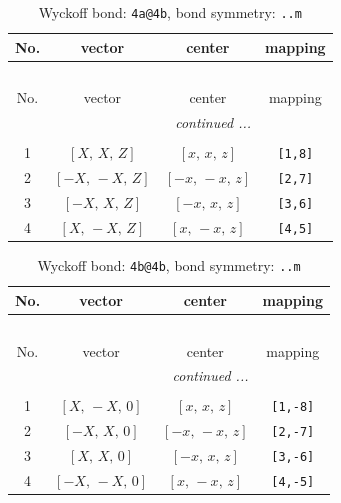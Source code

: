 \documentclass[fleqn,8pt]{jsarticle}
\begin{document}
\begin{longtable}{cccc}
\caption{Wyckoff bond: {\tt 4a@4b}, bond symmetry: {\tt ..m}}
 \\
 \hline \hline
No. & vector & center & mapping \\ \hline \endfirsthead

\multicolumn{3}{l}{\tablename\ \thetable{}} \\
 \hline \hline
No. & vector & center & mapping \\ \hline \endhead

 \hline \hline
\multicolumn{3}{r}{\footnotesize\it continued ...} \\ \endfoot

 \hline \hline
\multicolumn{3}{r}{} \\ \endlastfoot

1 & $\left[ X,\, X,\, Z \right]$ & $\left[ x,\, x,\, z \right]$ & {\tt [1,8]} \\ \hline
2 & $\left[ - X,\, - X,\, Z \right]$ & $\left[ - x,\, - x,\, z \right]$ & {\tt [2,7]} \\ \hline
3 & $\left[ - X,\, X,\, Z \right]$ & $\left[ - x,\, x,\, z \right]$ & {\tt [3,6]} \\ \hline
4 & $\left[ X,\, - X,\, Z \right]$ & $\left[ x,\, - x,\, z \right]$ & {\tt [4,5]} \\
\end{longtable}
\renewcommand{\arraystretch}{1.2}
\begin{longtable}{cccc}
\caption{Wyckoff bond: {\tt 4b@4b}, bond symmetry: {\tt ..m}}
 \\
 \hline \hline
No. & vector & center & mapping \\ \hline \endfirsthead

\multicolumn{3}{l}{\tablename\ \thetable{}} \\
 \hline \hline
No. & vector & center & mapping \\ \hline \endhead

 \hline \hline
\multicolumn{3}{r}{\footnotesize\it continued ...} \\ \endfoot

 \hline \hline
\multicolumn{3}{r}{} \\ \endlastfoot

1 & $\left[ X,\, - X,\, 0 \right]$ & $\left[ x,\, x,\, z \right]$ & {\tt [1,-8]} \\ \hline
2 & $\left[ - X,\, X,\, 0 \right]$ & $\left[ - x,\, - x,\, z \right]$ & {\tt [2,-7]} \\ \hline
3 & $\left[ X,\, X,\, 0 \right]$ & $\left[ - x,\, x,\, z \right]$ & {\tt [3,-6]} \\ \hline
4 & $\left[ - X,\, - X,\, 0 \right]$ & $\left[ x,\, - x,\, z \right]$ & {\tt [4,-5]} \\
\end{longtable}
\end{document}
